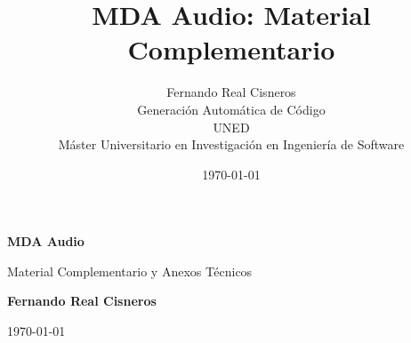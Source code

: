 \documentclass[12pt,a4paper]{report}
\title{MDA Audio: Material Complementario}
\author{Fernando Real Cisneros \\ \small Generación Automática de Código \\ \small UNED \\ \small Máster Universitario en Investigación en Ingeniería de Software}
\date{\today}
\begin{document}
\begin{titlepage}
    \centering
    \vspace*{4cm}
    {\Huge \bfseries MDA Audio \par}
    \vspace{1.5cm}
    {\Large Material Complementario y Anexos Técnicos \par}
    \vspace{2cm}
    {\Large \textbf{Fernando Real Cisneros} \par}
    \vfill
    {\large \today \par}
\end{titlepage}

\tableofcontents
\newpage

\appendix



\cleardoublepage
{}
\listoffigures
\end{document}
